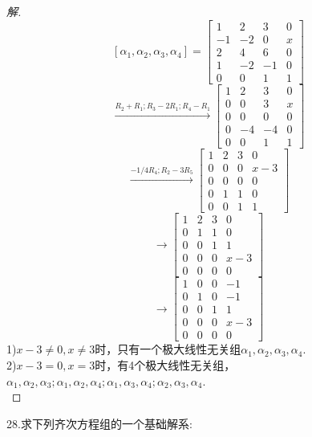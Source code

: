 \documentclass[10pt,a4paper]{report}
\begin{document}
\begin{proof}[解]
	$$
	[\alpha_{1}, \alpha_{2}, \alpha_{3}, \alpha_{4}] = \left[
	\begin{matrix}
	1 & 2 & 3 & 0 \\
	-1 & -2 & 0 & x \\
	2 & 4 & 6 & 0 \\
	1 & -2 & -1 & 0\\
	0 & 0 & 1 & 1
	\end{matrix}
	\right]	
	$$
	$$
	\xrightarrow{R_{2}+R_{1};R_{3}-2R_{1};R_{4}-R_{1}}
	 \left[
	\begin{matrix}
	1 & 2 & 3 & 0 \\
	0 & 0 & 3 & x \\
	0 & 0 & 0 & 0 \\
	0 & -4 & -4 & 0\\
	0 & 0 & 1 & 1
	\end{matrix}
	\right]
	$$
	$$
	\xrightarrow{-1/4R_{4};R_{2}-3R_{5}}
	\left[
	\begin{matrix}
	1 & 2 & 3 & 0 \\
	0 & 0 & 0 & x-3 \\
	0 & 0 & 0 & 0 \\
	0 & 1 & 1 & 0\\
	0 & 0 & 1 & 1
	\end{matrix}
	\right]
	$$
	$$
	\xrightarrow{}
	\left[
	\begin{matrix}
	1 & 2 & 3 & 0 \\
	0 & 1 & 1 & 0\\
	0 & 0 & 1 & 1\\
	0 & 0 & 0 & x-3 \\
	0 & 0 & 0 & 0 
	\end{matrix}
	\right]
	$$
	$$
	\xrightarrow{}
	\left[
	\begin{matrix}
	1 & 0 & 0 & -1 \\
	0 & 1 & 0 & -1\\
	0 & 0 & 1 & 1\\
	0 & 0 & 0 & x-3 \\
	0 & 0 & 0 & 0 
	\end{matrix}
	\right]
	$$
	1)$x-3 \neq 0, x \neq 3$时，只有一个极大线性无关组$\alpha_{1}, \alpha_{2}, \alpha_{3}, \alpha_{4}$.\\
	2)$x-3=0, x=3$时，有4个极大线性无关组，$\alpha_{1}, \alpha_{2}, \alpha_{3};\alpha_{1}, \alpha_{2}, \alpha_{4};\alpha_{1}, \alpha_{3}, \alpha_{4};\alpha_{2}, \alpha_{3}, \alpha_{4}$.\\
\end{proof}
\noindent 28.求下列齐次方程组的一个基础解系:\\
\end{document}
